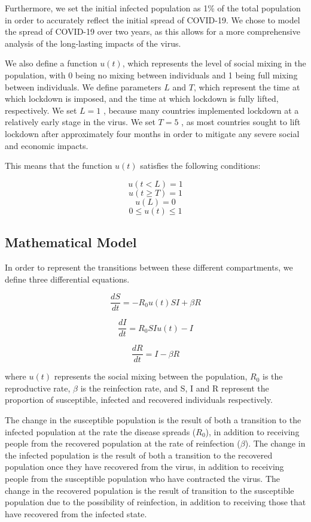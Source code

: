 \documentclass[10pt]{article}
\begin{document}
Furthermore, we set the initial infected population as  1\% of the total population in order to accurately reflect the initial spread of COVID-19. We chose to model the spread of COVID-19 over two years, as this allows for a more comprehensive analysis of the long-lasting impacts of the virus. \newline

We also define a function $u(t)$, which represents the level of social mixing in the population, with 0 being no mixing between individuals and 1 being full mixing between individuals. We define parameters $L$ and $T$, which represent the time at which lockdown is imposed, and the time at which lockdown is fully lifted, respectively. We set $L = 1$ , because many countries implemented lockdown at a relatively early stage in the virus. We set $T = 5$ , as most countries sought to lift lockdown after approximately four months in order to mitigate any severe social and economic impacts.


This means that the function $u(t)$ satisfies the following conditions:

$$u(t < L) = 1 $$
$$u(t \geq T) = 1$$
$$u(L) = 0 $$
$$0 \leq u(t) \leq 1$$

\subsection{Mathematical Model}
In order to represent the transitions between these different compartments, we define three differential equations.

$$ \frac {dS} {dt } = - R_0 u(t) S I + \beta R $$

$$ \frac {dI} {dt}  = R_0 S I u(t) - I $$

$$ \frac {dR} {dt} = I - \beta R $$

where $u(t)$ represents the social mixing between the population, $R_0$ is the reproductive rate, $\beta$ is the reinfection rate, and S, I and R represent the proportion of susceptible, infected and recovered individuals respectively.

The change in the susceptible population is the result of both a transition  to the infected population at the rate the disease spreads ($R_0$), in addition to receiving people from the recovered population at the rate of reinfection ($\beta$). The change in the infected population is the result of both a transition to the recovered population once they have recovered from the virus, in addition to receiving people from the susceptible population who have contracted the virus. The change in the recovered population is the result of transition to the susceptible population due to the possibility of reinfection, in addition to receiving those that have recovered from the infected state.
\end{document}
